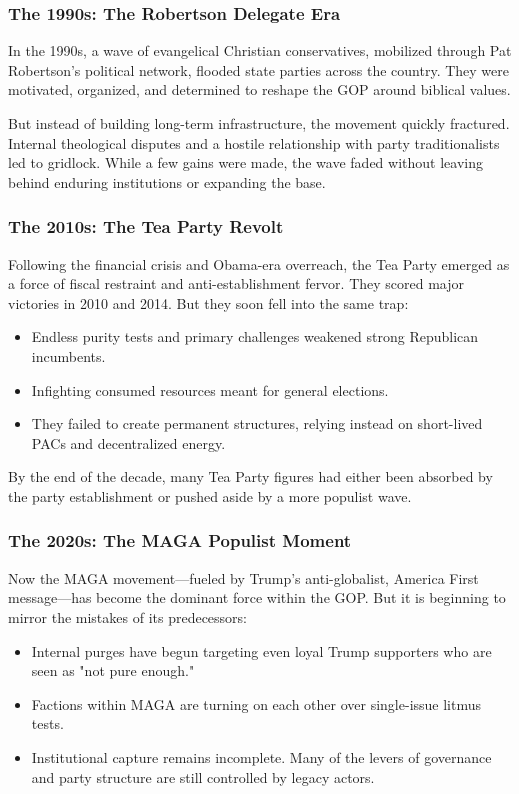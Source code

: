 \subsubsection{The 1990s: The Robertson Delegate Era}
In the 1990s, a wave of evangelical Christian conservatives, mobilized through Pat Robertson’s political network, flooded state parties across the country. They were motivated, organized, and determined to reshape the GOP around biblical values.

But instead of building long-term infrastructure, the movement quickly fractured. Internal theological disputes and a hostile relationship with party traditionalists led to gridlock. While a few gains were made, the wave faded without leaving behind enduring institutions or expanding the base.

\subsubsection{The 2010s: The Tea Party Revolt}
Following the financial crisis and Obama-era overreach, the Tea Party emerged as a force of fiscal restraint and anti-establishment fervor. They scored major victories in 2010 and 2014. But they soon fell into the same trap:
\begin{itemize}
\item Endless purity tests and primary challenges weakened strong Republican incumbents.
\item Infighting consumed resources meant for general elections.
\item They failed to create permanent structures, relying instead on short-lived PACs and decentralized energy.
\end{itemize}

By the end of the decade, many Tea Party figures had either been absorbed by the party establishment or pushed aside by a more populist wave.

\subsubsection{The 2020s: The MAGA Populist Moment}
Now the MAGA movement—fueled by Trump’s anti-globalist, America First message—has become the dominant force within the GOP. But it is beginning to mirror the mistakes of its predecessors:
\begin{itemize}
\item Internal purges have begun targeting even loyal Trump supporters who are seen as "not pure enough."
\item Factions within MAGA are turning on each other over single-issue litmus tests.
\item Institutional capture remains incomplete. Many of the levers of governance and party structure are still controlled by legacy actors.
\end{itemize}


